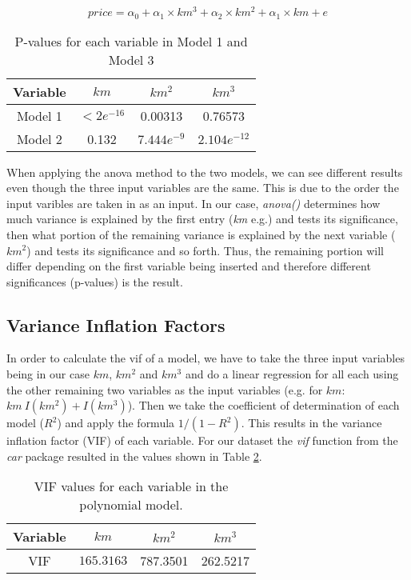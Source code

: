 \begin{equation}
	price = \alpha_0 + \alpha_1 \times km^3 + \alpha_2 \times km^2 + \alpha_1 \times km +e
\end{equation}

\begin{table}[H]
\centering
\begin{tabular}{||c |c c c||}
 \hline
 Variable & $km$ & $km^2$ & $km^3$ \\ [0.5ex]
 \hline
 Model 1 & $< 2 e^{-16}$ & 0.00313 & 0.76573 \\
 Model 2 & 0.132 & $7.444 e^{-9}$ & $2.104 e^{-12}$ \\
 \hline
\end{tabular}
\caption{P-values for each variable in Model 1 and Model 3}
\label{tab:3}
\end{table}

\noindent
When applying the anova method to the two models, we can see different results even though the three input variables are the same. This is due to the order the input varibles are taken in as an input. In our case, \textit{anova()} determines how much variance is explained by the first entry (\textit{km} e.g.) and tests its significance, then what portion of the remaining variance is explained by the next variable ($km^2$) and tests its significance and so forth. Thus, the remaining portion will differ depending on the first variable being inserted and therefore  different significances (p-values) is the result.


\subsection{Variance Inflation Factors} %
\label{sub:variance_inflation_factors}



In order to calculate the vif of a model, we have to take the three input variables 
being in our case $km$, $km^2$ and $km^3$ and do a linear regression for all each
using the other remaining two variables as the input variables (e.g. for $km
$: $km ~ I(km^2) + I(km^3)$). Then we take the coefficient of determination of each model ($R^2$) and apply the formula $1 / ( 1 - R^2 )$. This results in the variance inflation factor (VIF) of each variable. For our dataset the \textit{vif} function from the \textit{car} package resulted in the values shown in Table \ref{tab:vif}.

\begin{table}[H]
\centering
\begin{tabular}{||c ||c c c||}
 \hline
 Variable & $km$ & $km^2$ & $km^3$ \\ [0.5ex]
 \hline
 VIF & $ 165.3163 $ & 787.3501 & 262.5217 \\
 \hline
\end{tabular}
\caption{VIF values for each variable in the polynomial model.}
\label{tab:vif}
\end{table}

